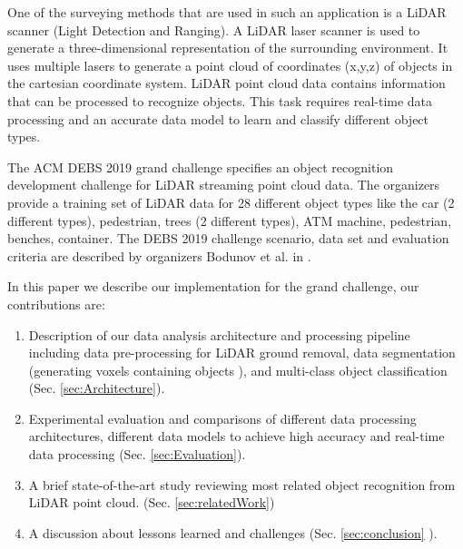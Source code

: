\documentclass[sigconf]{acmart}
\begin{document}
One of the surveying methods that are used in such an application is a LiDAR scanner (Light Detection and Ranging). A LiDAR laser scanner is used to generate a three-dimensional representation of the surrounding environment. It uses multiple lasers to generate a point cloud of coordinates (x,y,z) of objects in the cartesian coordinate system. LiDAR point cloud data contains information that can be processed to recognize objects. This task requires real-time data processing and an accurate data model to learn and classify different object types.

The ACM DEBS 2019 grand challenge \cite{DEBSGC2019} specifies an object recognition development challenge for LiDAR streaming point cloud data.
The organizers provide a training set of LiDAR data for 28 different object types like the car (2 different types), pedestrian, trees (2 different types),
 ATM machine, pedestrian, benches, container. The DEBS 2019 challenge scenario, data set and evaluation criteria are 
 described by organizers Bodunov et al. in \cite{DEBSGC2019}.

In this paper we describe our implementation for the grand challenge, our contributions are:


\begin{enumerate}
  
  \item Description of our data analysis architecture and processing pipeline including data pre-processing for LiDAR ground removal, 
  data segmentation (generating voxels containing objects ), and multi-class object classification  (Sec.  \ref{sec:Architecture}).
  \item Experimental evaluation and comparisons of different data processing architectures, different data models to achieve high 
  accuracy and real-time data processing (Sec. \ref{sec:Evaluation}).
  \item A brief state-of-the-art study reviewing most related object recognition from LiDAR point cloud.  (Sec. \ref{sec:relatedWork})
  \item A discussion about lessons learned and challenges (Sec. \ref{sec:conclusion} ).
\end{enumerate}




























\end{document}
